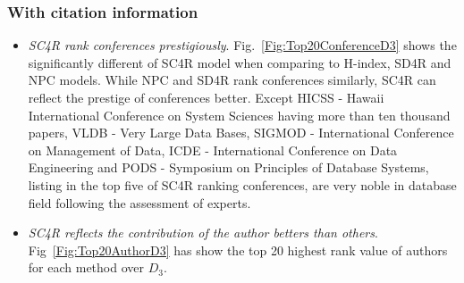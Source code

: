 \documentclass[10pt,leqno,twoside]{article}
\begin{document}
\subsubsection{With citation information}
%
%
\begin{itemize}
\item \textit{SC4R rank conferences prestigiously}. Fig.~\ref{Fig:Top20ConferenceD3} shows the significantly different of SC4R model when comparing to H-index, SD4R and NPC models. While NPC and SD4R rank conferences similarly, SC4R can reflect the prestige of conferences better. Except HICSS - Hawaii International Conference on System Sciences having more than ten thousand papers, VLDB - Very Large Data Bases, SIGMOD - International Conference on Management of Data, ICDE - International Conference on Data Engineering and PODS - Symposium on Principles of Database Systems, listing in the top five of SC4R ranking conferences, are very noble in database field following the assessment of experts.

\item\textit{SC4R reflects the contribution of the author betters than others}. Fig~\ref{Fig:Top20AuthorD3} has show the top 20 highest rank value of authors for each method over $D_3$. 

\end{itemize}
\end{document}
